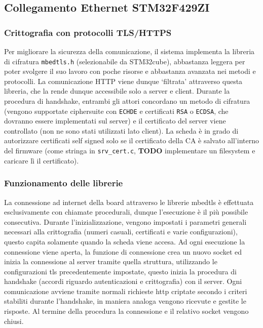 \subsection{Collegamento Ethernet STM32F429ZI}

\subsubsection{Crittografia con protocolli TLS/HTTPS}

Per migliorare la sicurezza della comunicazione, il sistema implementa la libreria di cifratura \texttt{mbedtls.h} (selezionabile da STM32cube), abbastanza leggera per poter svolgere il suo lavoro con poche risorse e abbastanza avanzata nei metodi e protocolli. La comunicazione HTTP viene dunque `filtrata' attraverso questa libreria, che la rende dunque accessibile solo a server e client. Durante la procedura di handshake, entrambi gli attori concordano un metodo di cifratura (vengono supportate ciphersuite con \texttt{ECHDE} e certificati \texttt{RSA} o \texttt{ECDSA}, che dovranno essere implementati sul server) e il certificato del server viene controllato (non ne sono stati utilizzati lato client). La scheda \`e in grado di autorizzare certificati self signed solo se il certificato della CA \`e salvato all'interno del firmware (come stringa in \texttt{srv\_cert.c}, \textbf{TODO} implementare un filesystem e caricare l\`i il certificato).

\subsubsection{Funzionamento delle librerie}

La connessione ad internet della board attraverso le librerie mbedtls \`e effettuata esclusivamente con chiamate procedurali, dunque l'esecuzione \`e il pi\`u possibile consecutiva. Durante l'inizializzazione, vengono impostati i parametri generali necessari alla crittografia (numeri casuali, certificati e varie configurazioni), questo capita solamente quando la scheda viene accesa. Ad ogni esecuzione la connessione viene aperta, la funzione di connessione crea un nuovo socket ed inizia la connessione al server tramite quella struttura, utilizzando le configurazioni tls precedentemente impostate, questo inizia la procedura di handshake (accordi riguardo autenticazioni e crittografia) con il server. Ogni comunicazione avviene tramite normali richieste http criptate secondo i criteri stabiliti durante l'handshake, in maniera analoga vengono ricevute e gestite le risposte. Al termine della procedura la connessione e il relativo socket vengono chiusi.

